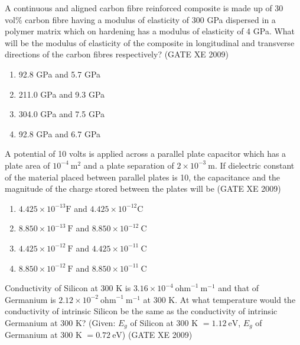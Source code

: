     \item A continuous and aligned carbon fibre reinforced composite is made up of 30 vol\% carbon fibre having a modulus of elasticity of 300 GPa dispersed in a polymer matrix which on hardening has a modulus of elasticity of 4 GPa. What will be the modulus of elasticity of the composite in longitudinal and transverse directions of the carbon fibres respectively? \hfill (GATE XE 2009)

    \begin{multicols}{2}
        \begin{enumerate}
            \item 92.8 GPa and 5.7 GPa
            \item 211.0 GPa and 9.3 GPa
            \item 304.0 GPa and 7.5 GPa
            \item 92.8 GPa and 6.7 GPa
        \end{enumerate}
    \end{multicols}

    \item A potential of 10 volts is applied across a parallel plate capacitor which has a plate area of $10^{-4} \ \text{m}^2$ and a plate separation of $2 \times 10^{-3} \ \text{m}$. If dielectric constant of the material placed between parallel plates is 10, the capacitance and the magnitude of the charge stored between the plates will be \hfill (GATE XE 2009)

    \begin{enumerate}
        \item $4.425 \times 10^{-13} \text{F}$ and $4.425 \times 10^{-12} \text{C}$
        \item $8.850 \times 10^{-13} \ \text{F}$ and $8.850 \times 10^{-12} \ \text{C}$
        \item $4.425 \times 10^{-12} \ \text{F}$ and $4.425 \times 10^{-11} \ \text{C}$
        \item $8.850 \times 10^{-12} \ \text{F}$ and $8.850 \times 10^{-11} \ \text{C}$
    \end{enumerate}

    \item Conductivity of Silicon at 300 K is $3.16 \times 10^{-4} \ \text{ohm}^{-1} \ \text{m}^{-1}$ and that of Germanium is $2.12 \times 10^{-2} \ \text{ohm}^{-1} \ \text{m}^{-1}$ at 300 K. At what temperature would the conductivity of intrinsic Silicon be the same as the conductivity of intrinsic Germanium at 300 K? (Given: $E_g$ of Silicon at 300 K $= 1.12 \ \text{eV}$, $E_g$ of Germanium at 300 K $= 0.72 \ \text{eV}$) \hfill (GATE XE 2009)

